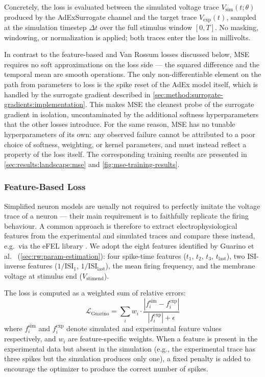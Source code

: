 Concretely, the loss is evaluated between the simulated voltage trace $V_{\text{sim}}(t; \theta)$ produced by the AdExSurrogate channel and the target trace $V_{\text{exp}}(t)$,
sampled at the simulation timestep $\Delta t$ over the full stimulus window $[0, T]$.
No masking, windowing, or normalization is applied; both traces enter the loss in millivolts.

In contrast to the feature-based and Van Rossum losses discussed below, \gls{MSE} requires no soft approximations on the loss side ---
the squared difference and the temporal mean are smooth operations.
The only non-differentiable element on the path from parameters to loss is the spike reset of the AdEx model itself,
which is handled by the surrogate gradient described in \cref{sec:method:surrogate-gradients:implementation}.
This makes \gls{MSE} the cleanest probe of the surrogate gradient in isolation,
uncontaminated by the additional softness hyperparameters that the other losses introduce.
For the same reason, \gls{MSE} has no tunable hyperparameters of its own:
any observed failure cannot be attributed to a poor choice of softness, weighting, or kernel parameters,
and must instead reflect a property of the loss itself.
The corresponding training results are presented in \cref{sec:results:landscape:mse} and \cref{fig:mse-training-results}.

\subsubsection{Feature-Based Loss}\label{sec:method:opt:loss:feature-loss}
Simplified neuron models are usually not required to perfectly imitate the voltage trace of a neuron --- their main requirement is to faithfully replicate the firing behaviour.
A common approach is therefore to extract electrophysiological features from the experimental and simulated traces and compare these instead, e.g.\ via the eFEL library \cite{VanGeit2024}.
We adopt the eight features identified by Guarino et al.~\cite{Guarino2025} (\cref{sec:rw:param-estimation}): four spike-time features ($t_1$, $t_2$, $t_3$, $t_{\text{last}}$), two ISI-inverse features ($1/\text{ISI}_1$, $1/\text{ISI}_{\text{last}}$), the mean firing frequency, and the membrane voltage at stimulus end ($V_{\text{stimend}}$).

The loss is computed as a weighted sum of relative errors:
\begin{equation}\label{eq:guarino}
    \mathcal{L}_{\text{Guarino}} = \sum_i w_i \cdot \frac{|f_i^{\text{sim}} - f_i^{\text{exp}}|}{|f_i^{\text{exp}}| + \epsilon}
\end{equation}
where $f_i^{\text{sim}}$ and $f_i^{\text{exp}}$ denote simulated and experimental feature values respectively,
and $w_i$ are feature-specific weights.
When a feature is present in the experimental data but absent in the simulation
(e.g., the experimental trace has three spikes but the simulation produces only one),
a fixed penalty is added to encourage the optimizer to produce the correct number of spikes.

